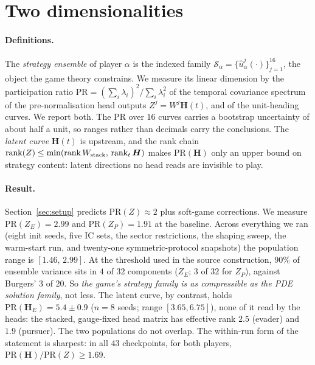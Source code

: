\documentclass[twoside,11pt]{article}
\newcommand{\HH}{\bm{H}}
\newcommand{\PR}{\mathrm{PR}}
\begin{document}
\section{Two dimensionalities}
\label{sec:twodims}

\paragraph{Definitions.}  The \emph{strategy ensemble} of player
$\alpha$ is the indexed family
$\mathcal{S}_\alpha = \{\hat u^{j}_\alpha(\cdot)\}_{j=1}^{16}$, the
object the game theory constrains.  We measure its linear dimension by
the participation ratio
$\PR = (\sum_i \lambda_i)^{2} / \sum_i \lambda_i^{2}$ of the temporal
covariance spectrum of the pre-normalisation head outputs
$Z^{j} = W^{j}\HH(t)$, and of the unit-heading curves.  We report
both.  The $\PR$ over $16$ curves carries a bootstrap uncertainty of
about half a unit, so ranges rather than decimals carry the
conclusions.  The \emph{latent curve} $\HH(t)$ is upstream, and the
rank chain
$\mathrm{rank}(Z) \le \min(\mathrm{rank}\,W_{\rm stack},\,
\mathrm{rank}_t\,\HH)$
makes $\PR(\HH)$ only an upper bound on strategy content: latent
directions no head reads are invisible to play.

\paragraph{Result.}  Section~\ref{sec:setup} predicts
$\PR(Z) \approx 2$ plus soft-game corrections.  We measure
$\PR(Z_E) = 2.99$ and $\PR(Z_P) = 1.91$ at the baseline.  Across
everything we ran (eight init seeds, five IC sets, the sector
restrictions, the shaping sweep, the warm-start run, and twenty-one
symmetric-protocol snapshots) the population range is
$[1.46,\,2.99]$.  At the threshold used in the source construction,
$90\%$ of ensemble variance sits in $4$ of $32$ components ($Z_E$; $3$
of $32$ for $Z_P$), against Burgers' $3$ of $20$.  So \emph{the game's
strategy family is as compressible as the PDE solution family}, not
less.  The latent curve, by contrast, holds
$\PR(\HH_E) = 5.4 \pm 0.9$ ($n = 8$ seeds; range $[3.65, 6.75]$),
none of it read by the heads: the stacked, gauge-fixed head matrix
has effective rank $2.5$ (evader) and $1.9$ (pursuer).  The two
populations do not overlap.  The within-run form of the statement is
sharpest: in all $43$ checkpoints, for both players,
$\PR(\HH)/\PR(Z) \ge 1.69$.
\end{document}
